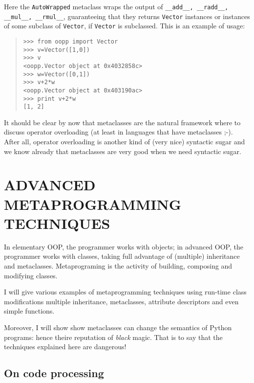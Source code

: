 \documentclass[10pt,english]{article}
\begin{document}
Here the \texttt{AutoWrapped} metaclass wraps the output of \texttt{{\_}{\_}add{\_}{\_}, 
{\_}{\_}radd{\_}{\_}, {\_}{\_}mul{\_}{\_}, {\_}{\_}rmul{\_}{\_}}, guaranteeing that they returns \texttt{Vector}
instances or instances of some subclass of \texttt{Vector}, if \texttt{Vector} is
subclassed. This is an example of usage:
\begin{quote}
\begin{verbatim}>>> from oopp import Vector
>>> v=Vector([1,0])
>>> v
<oopp.Vector object at 0x4032858c>
>>> w=Vector([0,1])
>>> v+2*w
<oopp.Vector object at 0x403190ac>
>>> print v+2*w
[1, 2]\end{verbatim}
\end{quote}

It should be clear by now that metaclasses are the natural framework where
to discuss operator overloading
(at least in languages that have metaclasses ;-). After all, operator
overloading is another kind of (very nice) syntactic sugar and we know
already that metaclasses are very good when we need syntactic sugar.



\hypertarget{advanced-metaprogramming-techniques}{}
\section*{ADVANCED METAPROGRAMMING TECHNIQUES}

In elementary OOP, the programmer works with objects; in advanced OOP,
the programmer works with classes, taking full advantage of
(multiple) inheritance and metaclasses. Metaprograming is the activity of 
building, composing and modifying classes.

I will give various examples of metaprogramming techniques
using run-time class modifications
multiple inheritance, metaclasses, attribute descriptors and
even simple functions.

Moreover, I will show show metaclasses can change the
semantics of Python programs: hence theire reputation of \emph{black} magic. 
That is to say that the techniques explained here are dangerous!



\hypertarget{on-code-processing}{}
\subsection*{On code processing}
\end{document}
